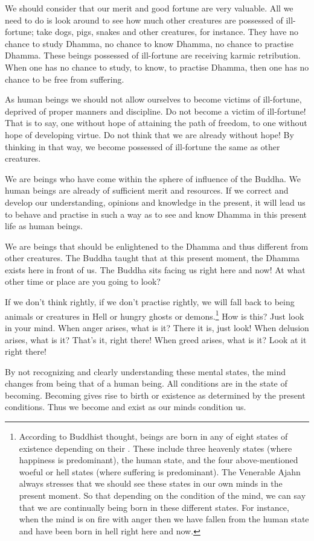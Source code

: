 We should consider that our merit and good fortune are very valuable. All we need to do is look around to see how much other creatures are possessed of ill-fortune; take dogs, pigs, snakes and other creatures, for instance. They have no chance to study Dhamma, no chance to know Dhamma, no chance to practise Dhamma. These beings possessed of ill-fortune are receiving karmic retribution. When one has no chance to study, to know, to practise Dhamma, then one has no chance to be free from suffering.

As human beings we should not allow ourselves to become victims of ill-fortune, deprived of proper manners and discipline. Do not become a victim of ill-fortune! That is to say, one without hope of attaining the path of freedom, to  one without hope of developing virtue. Do not think that we are already without hope! By thinking in that way, we become possessed of ill-fortune the same as other creatures.

We are beings who have come within the sphere of influence of the Buddha. We human beings are already of sufficient merit and resources. If we correct and develop our understanding, opinions and knowledge in the present, it will lead us to behave and practise in such a way as to see and know Dhamma in this present life as human beings.

We are beings that should be enlightened to the Dhamma and thus different from other creatures. The Buddha taught that at this present moment, the Dhamma exists here in front of us. The Buddha sits facing us right here and now! At what other time or place are you going to look?

If we don't think rightly, if we don't practise rightly, we will fall back to being animals or creatures in Hell or hungry ghosts or demons.\footnote{According to Buddhist thought, beings are born in any of eight states of existence depending on their . These include three heavenly states (where happiness is predominant), the human state, and the four above-mentioned woeful or hell states (where suffering is predominant). The Venerable Ajahn always stresses that we should see these states in our own minds in the present moment. So that depending on the condition of the mind, we can say that we are continually being born in these different states. For instance, when the mind is on fire with anger then we have fallen from the human state and have been born in hell right here and now.} How is this? Just look in your mind. When anger arises, what is it? There it is, just look! When delusion arises, what is it? That's it, right there! When greed arises, what is it? Look at it right there!

By not recognizing and clearly understanding these mental states, the mind changes from being that of a human being. All conditions are in the state of becoming. Becoming gives rise to birth or existence as determined by the present conditions. Thus we become and exist as our minds condition us.

